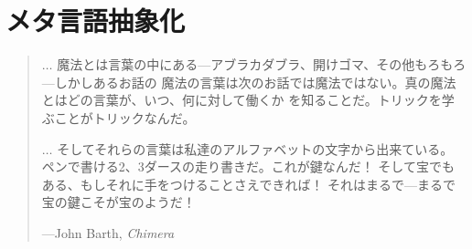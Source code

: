 \chapter{メタ言語抽象化}
\label{Chapter 4}

\begin{quote}


\( \dots \) 魔法とは言葉の中にある---アブラカダブラ、開けゴマ、その他もろもろ---しかしあるお話の
魔法の言葉は次のお話では魔法ではない。真の魔法とはどの言葉が、いつ、何に対して働くか
を知ることだ。トリックを学ぶことがトリックなんだ。



\( \dots \) そしてそれらの言葉は私達のアルファベットの文字から出来ている。
ペンで書ける2、3ダースの走り書きだ。これが鍵なんだ！
そして宝でもある、もしそれに手をつけることさえできれば！
それはまるで---まるで宝の鍵こそが宝のようだ！

---John Barth, \textit{Chimera}
\end{quote}

\vspace{0.8em}

